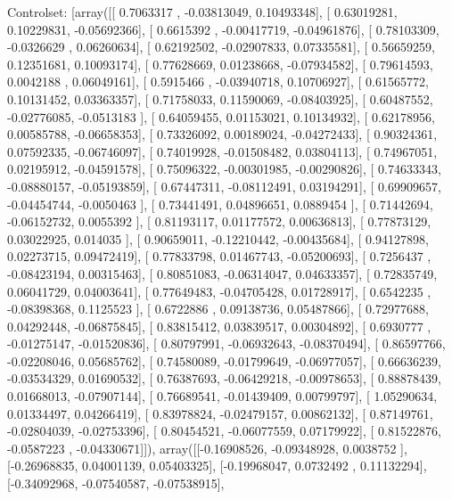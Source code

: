 \documentclass{article}
\begin{document}
Controlset: [array([[ 0.7063317 , -0.03813049,  0.10493348],
       [ 0.63019281,  0.10229831, -0.05692366],
       [ 0.6615392 , -0.00417719, -0.04961876],
       [ 0.78103309, -0.0326629 ,  0.06260634],
       [ 0.62192502, -0.02907833,  0.07335581],
       [ 0.56659259,  0.12351681,  0.10093174],
       [ 0.77628669,  0.01238668, -0.07934582],
       [ 0.79614593,  0.0042188 ,  0.06049161],
       [ 0.5915466 , -0.03940718,  0.10706927],
       [ 0.61565772,  0.10131452,  0.03363357],
       [ 0.71758033,  0.11590069, -0.08403925],
       [ 0.60487552, -0.02776085, -0.0513183 ],
       [ 0.64059455,  0.01153021,  0.10134932],
       [ 0.62178956,  0.00585788, -0.06658353],
       [ 0.73326092,  0.00189024, -0.04272433],
       [ 0.90324361,  0.07592335, -0.06746097],
       [ 0.74019928, -0.01508482,  0.03804113],
       [ 0.74967051,  0.02195912, -0.04591578],
       [ 0.75096322, -0.00301985, -0.00290826],
       [ 0.74633343, -0.08880157, -0.05193859],
       [ 0.67447311, -0.08112491,  0.03194291],
       [ 0.69909657, -0.04454744, -0.0050463 ],
       [ 0.73441491,  0.04896651,  0.0889454 ],
       [ 0.71442694, -0.06152732,  0.0055392 ],
       [ 0.81193117,  0.01177572,  0.00636813],
       [ 0.77873129,  0.03022925,  0.014035  ],
       [ 0.90659011, -0.12210442, -0.00435684],
       [ 0.94127898,  0.02273715,  0.09472419],
       [ 0.77833798,  0.01467743, -0.05200693],
       [ 0.7256437 , -0.08423194,  0.00315463],
       [ 0.80851083, -0.06314047,  0.04633357],
       [ 0.72835749,  0.06041729,  0.04003641],
       [ 0.77649483, -0.04705428,  0.01728917],
       [ 0.6542235 , -0.08398368,  0.1125523 ],
       [ 0.6722886 ,  0.09138736,  0.05487866],
       [ 0.72977688,  0.04292448, -0.06875845],
       [ 0.83815412,  0.03839517,  0.00304892],
       [ 0.6930777 , -0.01275147, -0.01520836],
       [ 0.80797991, -0.06932643, -0.08370494],
       [ 0.86597766, -0.02208046,  0.05685762],
       [ 0.74580089, -0.01799649, -0.06977057],
       [ 0.66636239, -0.03534329,  0.01690532],
       [ 0.76387693, -0.06429218, -0.00978653],
       [ 0.88878439,  0.01668013, -0.07907144],
       [ 0.76689541, -0.01439409,  0.00799797],
       [ 1.05290634,  0.01334497,  0.04266419],
       [ 0.83978824, -0.02479157,  0.00862132],
       [ 0.87149761, -0.02804039, -0.02753396],
       [ 0.80454521, -0.06077559,  0.07179922],
       [ 0.81522876, -0.0587223 , -0.04330671]]), array([[-0.16908526, -0.09348928,  0.0038752 ],
       [-0.26968835,  0.04001139,  0.05403325],
       [-0.19968047,  0.0732492 ,  0.11132294],
       [-0.34092968, -0.07540587, -0.07538915],
\end{document}
